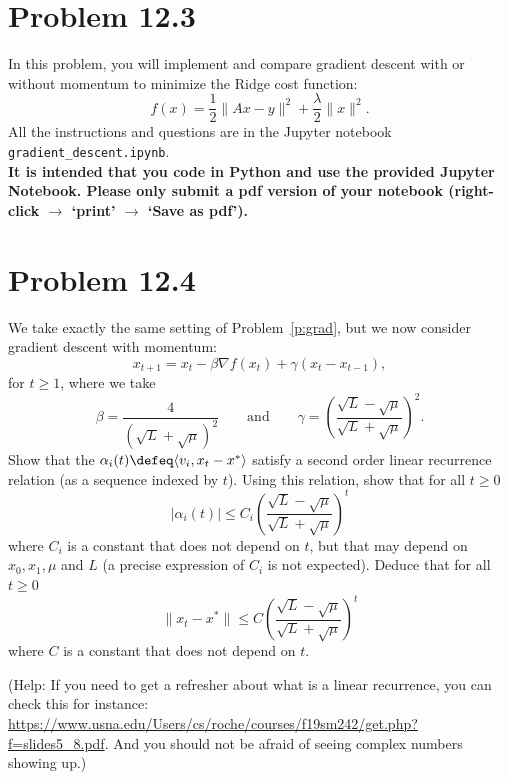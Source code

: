 \documentclass[12pt,twoside]{article}
\begin{document}
\vspace{5mm}

\section{Problem 12.3}
	In this problem, you will implement and compare gradient descent with or without momentum to minimize the Ridge cost function:
	$$
	f(x) = \frac{1}{2} \|Ax-y\|^2 + \frac{\lambda}{2} \|x\|^2.
	$$
	All the instructions and questions are in the Jupyter notebook \texttt{gradient\_descent.ipynb}.
	\\

	\textbf{It is intended that you code in Python and use the provided Jupyter Notebook. Please only submit a pdf version of your notebook (right-click $\to$ `print' $\to$ `Save as pdf').}




\vspace{5mm}

\section{Problem 12.4}
	We take exactly the same setting of Problem~\ref{p:grad}, but we now consider gradient descent with momentum:
$$
x_{t+1} = x_t - \beta \nabla f(x_t) + \gamma(x_t -x_{t-1}),
$$
for $t \geq 1$,
where we take
$$
\beta = \frac{4}{(\sqrt{L} + \sqrt{\mu})^2}
\qquad \text{and} \qquad
\gamma = \left(\frac{\sqrt{L}-\sqrt{\mu}}{\sqrt{L}+\sqrt{\mu}}\right)^{\! 2}.
$$
Show that the $\alpha_i(t) \defeq \langle v_i, x_t - x^* \rangle$ satisfy a second order linear recurrence relation (as a sequence indexed by $t$). Using this relation, show that for all $t \geq 0$
$$
|\alpha_i(t)| \leq C_i \left(\frac{\sqrt{L}-\sqrt{\mu}}{\sqrt{L} + \sqrt{\mu}}\right)^{\! t}
$$
where $C_i$ is a constant that does not depend on $t$, but that may depend on $x_0,x_1, \mu$ and $L$ (a precise expression of $C_i$ is not expected). Deduce that for all $t \geq 0$
$$
\|x_t - x^*\| \leq C \left(\frac{\sqrt{L}-\sqrt{\mu}}{\sqrt{L} + \sqrt{\mu}}\right)^{\! t}
$$
where $C$ is a constant that does not depend on $t$.


(Help: If you need to get a refresher about what is a linear recurrence, you can check this for instance:
\url{https://www.usna.edu/Users/cs/roche/courses/f19sm242/get.php?f=slides5_8.pdf}. And you should not be afraid of seeing complex numbers showing up.)


%
%
\end{document}
